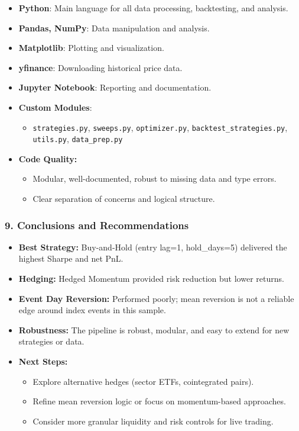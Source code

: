 \documentclass[11pt]{article}
\providecommand{\tightlist}{%
      \setlength{\itemsep}{0pt}\setlength{\parskip}{0pt}}
\begin{document}
\begin{itemize}
\tightlist
\item
  \textbf{Python}: Main language for all data processing, backtesting,
  and analysis.
\item
  \textbf{Pandas, NumPy}: Data manipulation and analysis.
\item
  \textbf{Matplotlib}: Plotting and visualization.
\item
  \textbf{yfinance}: Downloading historical price data.
\item
  \textbf{Jupyter Notebook}: Reporting and documentation.
\item
  \textbf{Custom Modules}:

  \begin{itemize}
  \tightlist
  \item
    \texttt{strategies.py}, \texttt{sweeps.py}, \texttt{optimizer.py},
    \texttt{backtest\_strategies.py}, \texttt{utils.py},
    \texttt{data\_prep.py}
  \end{itemize}
\item
  \textbf{Code Quality:}

  \begin{itemize}
  \tightlist
  \item
    Modular, well-documented, robust to missing data and type errors.
  \item
    Clear separation of concerns and logical structure.
  \end{itemize}
\end{itemize}

\subsubsection*{9. Conclusions and
Recommendations}\label{conclusions-and-recommendations}

\begin{itemize}
\tightlist
\item
  \textbf{Best Strategy:} Buy-and-Hold (entry lag=1, hold\_days=5)
  delivered the highest Sharpe and net PnL.
\item
  \textbf{Hedging:} Hedged Momentum provided risk reduction but lower
  returns.
\item
  \textbf{Event Day Reversion:} Performed poorly; mean reversion is not
  a reliable edge around index events in this sample.
\item
  \textbf{Robustness:} The pipeline is robust, modular, and easy to
  extend for new strategies or data.
\item
  \textbf{Next Steps:}

  \begin{itemize}
  \tightlist
  \item
    Explore alternative hedges (sector ETFs, cointegrated pairs).
  \item
    Refine mean reversion logic or focus on momentum-based approaches.
  \item
    Consider more granular liquidity and risk controls for live trading.
  \end{itemize}
\end{itemize}


    
    
    
\end{document}
